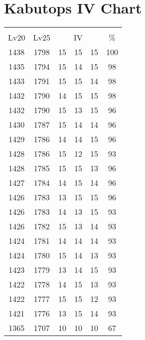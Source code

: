 \documentclass{article}%
\begin{document}
%
\normalsize%
\section{Kabutops IV Chart}%
\label{sec:Kabutops IV Chart}%
\renewcommand{\arraystretch}{1.5}%
\begin{tabular}{|c|c|c|c|c|c|}%
\hline%
\multicolumn{6}{|c|}{\textcolor{white}{ 
\linebreak{Kabutops}
}%
\cellcolor{black}}\\%
\multicolumn{1}{|c}{Lv20}&\multicolumn{1}{c|}{Lv25}&\multicolumn{3}{c|}{IV}&\multicolumn{1}{|c|}{\%}\\%
\hline%
\rowcolor{color100}%
1438&1798&15&15&15&100\\%
\hline%
\rowcolor{color98}%
1435&1794&15&14&15&98\\%
\hline%
\rowcolor{color98}%
1433&1791&15&15&14&98\\%
\hline%
\rowcolor{color98}%
1432&1790&14&15&15&98\\%
\hline%
\rowcolor{color96}%
1432&1790&15&13&15&96\\%
\hline%
\rowcolor{color96}%
1430&1787&15&14&14&96\\%
\hline%
\rowcolor{color96}%
1429&1786&14&14&15&96\\%
\hline%
\rowcolor{color93}%
1428&1786&15&12&15&93\\%
\hline%
\rowcolor{color96}%
1428&1785&15&15&13&96\\%
\hline%
\rowcolor{color96}%
1427&1784&14&15&14&96\\%
\hline%
\rowcolor{color96}%
1426&1783&13&15&15&96\\%
\hline%
\rowcolor{color93}%
1426&1783&14&13&15&93\\%
\hline%
\rowcolor{color93}%
1426&1782&15&13&14&93\\%
\hline%
\rowcolor{color93}%
1424&1781&14&14&14&93\\%
\hline%
\rowcolor{color93}%
1424&1780&15&14&13&93\\%
\hline%
\rowcolor{color93}%
1423&1779&13&14&15&93\\%
\hline%
\rowcolor{color93}%
1422&1778&14&15&13&93\\%
\hline%
\rowcolor{color93}%
1422&1777&15&15&12&93\\%
\hline%
\rowcolor{color93}%
1421&1776&13&15&14&93\\%
\hline%
\rowcolor{color91}%
1365&1707&10&10&10&67\\%
\end{tabular}

%
\end{document}
